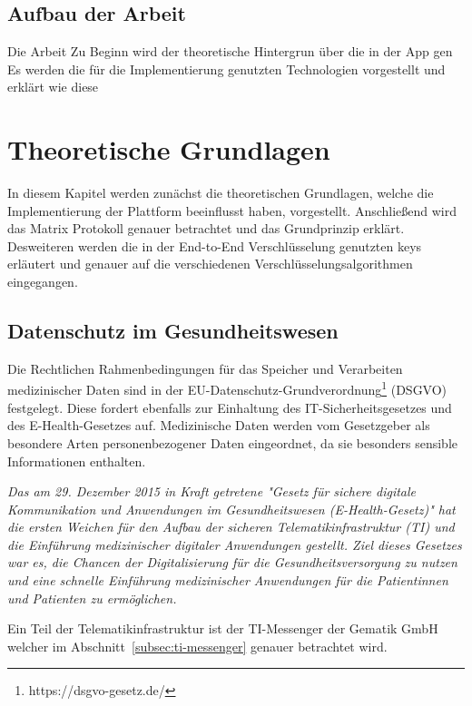     \section{Aufbau der Arbeit}\label{sec:aufbau-der-arbeit}
    Die Arbeit
    Zu Beginn wird der theoretische Hintergrun über die in der App gen
    Es werden die für die Implementierung genutzten Technologien vorgestellt und erklärt wie diese

    \newpage
    \chapter{Theoretische Grundlagen}\label{ch:theoretische-grundlagen}
    In diesem Kapitel werden zunächst die theoretischen Grundlagen, welche die Implementierung der Plattform beeinflusst haben, vorgestellt.
    Anschließend wird das Matrix Protokoll genauer betrachtet und das Grundprinzip erklärt.
    Desweiteren werden die in der End-to-End Verschlüsselung genutzten keys erläutert und genauer auf die verschiedenen Verschlüsselungsalgorithmen eingegangen.

    \section{Datenschutz im Gesundheitswesen}
    Die Rechtlichen Rahmenbedingungen für das Speicher und Verarbeiten medizinischer Daten sind in der EU-Datenschutz-Grundverordnung\footnote{https://dsgvo-gesetz.de/} (DSGVO) festgelegt.
    Diese fordert ebenfalls zur Einhaltung des IT-Sicherheitsgesetzes und des E-Health-Gesetzes auf.
    Medizinische Daten werden vom Gesetzgeber als besondere Arten personenbezogener Daten eingeordnet, da sie besonders sensible Informationen enthalten.~\cite{datenschutzimgesundeitswesen}

    \textit{Das am 29. Dezember 2015 in Kraft getretene "Gesetz für sichere digitale Kommunikation und Anwendungen im Gesundheitswesen (E-Health-Gesetz)" hat die ersten Weichen für den Aufbau der sicheren Telematikinfrastruktur (TI) und die Einführung medizinischer digitaler Anwendungen gestellt.
    Ziel dieses Gesetzes war es, die Chancen der Digitalisierung für die Gesundheitsversorgung zu nutzen und eine schnelle Einführung medizinischer Anwendungen für die Patientinnen und Patienten zu ermöglichen.}~\cite{ehealthgesetz}

    Ein Teil der Telematikinfrastruktur ist der TI-Messenger der Gematik GmbH welcher im Abschnitt~\ref{subsec:ti-messenger} genauer betrachtet wird.

